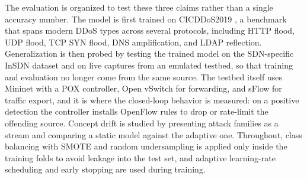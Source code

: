 \documentclass[ASNA,twocolumn]{USG} %
\begin{document}






The evaluation is organized to test these three claims rather than a single accuracy number. The model is first trained on CICDDoS2019 \cite{cicddos2019dataset}, a benchmark that spans modern DDoS types across several protocols, including HTTP flood, UDP flood, TCP SYN flood, DNS amplification, and LDAP reflection. Generalization is then probed by testing the trained model on the SDN-specific InSDN dataset and on live captures from an emulated testbed, so that training and evaluation no longer come from the same source. The testbed itself uses Mininet with a POX controller, Open vSwitch for forwarding, and sFlow for traffic export, and it is where the closed-loop behavior is measured: on a positive detection the controller installs OpenFlow rules to drop or rate-limit the offending source. Concept drift is studied by presenting attack families as a stream and comparing a static model against the adaptive one. Throughout, class balancing with SMOTE and random undersampling \cite{ratnasari2024performance} is applied only inside the training folds to avoid leakage into the test set, and adaptive learning-rate scheduling and early stopping are used during training.
\end{document}

